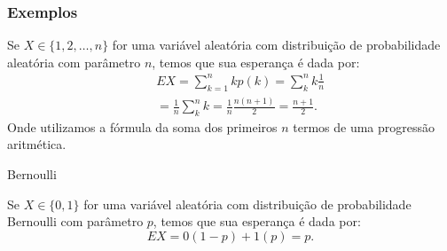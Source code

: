 \begin{frame}
\frametitle{Exemplos}
\begin{exem}[Aleatória]
Se $X\in\{1,2,\ldots,n\}$ for uma variável aleatória
com distribuição de probabilidade aleatória com parâmetro $n$, temos
que sua esperança é dada por:
\begin{eqnarray}
& & EX=\sum_{k=1}^{n}kp(k)=\sum_{k}^n k{\frac{1}{n}} \nonumber \\
& & =\frac{1}{n}\sum_{k}^n k=\frac{1}{n}\frac{n(n+1)}{2}=\frac{n+1}{2}.\nonumber
\end{eqnarray}
Onde utilizamos a fórmula da soma dos primeiros $n$ termos de uma
progressão aritmética.
\end{exem}

\begin{exem}{Bernoulli}

Se $X\in\{0,1\}$ for uma variável aleatória
com distribuição de probabilidade Bernoulli com parâmetro $p$, temos
que sua esperança é dada por:
$$EX=0(1-p)+1(p)=p.$$

\end{exem}
\end{frame}

